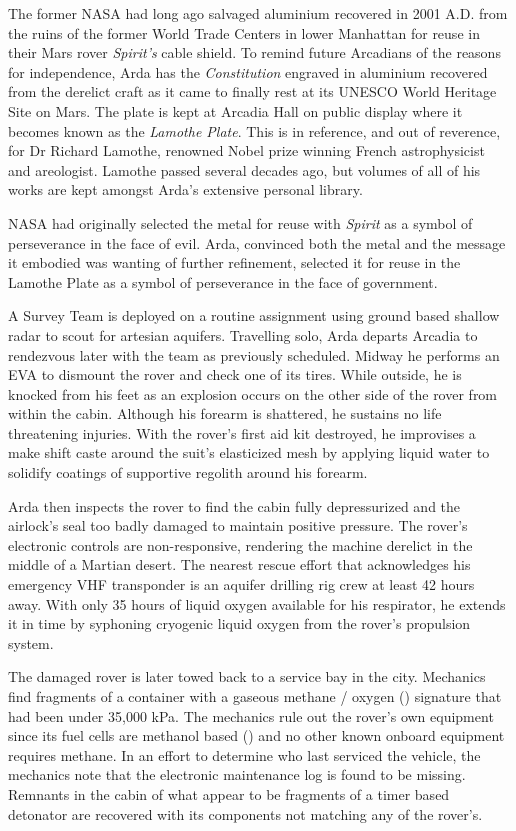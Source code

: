 The former NASA had long ago salvaged aluminium recovered in 2001 A.D. from the ruins of the former World Trade Centers in lower Manhattan for reuse in their Mars rover {\it Spirit's} cable shield. To remind future Arcadians of the reasons for independence, Arda has the {\it Constitution} engraved in aluminium recovered from the derelict craft as it came to finally rest at its UNESCO World Heritage Site on Mars. The plate is kept at Arcadia Hall on public display where it becomes known as the {\it Lamothe Plate}. This is in reference, and out of reverence, for Dr Richard Lamothe, renowned Nobel prize winning French astrophysicist and areologist. Lamothe passed several decades ago, but volumes of all of his works are kept amongst Arda's extensive personal library.

NASA had originally selected the metal for reuse with {\it Spirit} as a symbol of perseverance in the face of evil. Arda, convinced both the metal and the message it embodied was wanting of further refinement, selected it for reuse in the Lamothe Plate as a symbol of perseverance in the face of government.
\StopTimelineDate

A Survey Team is deployed on a routine assignment using ground based shallow radar to scout for artesian aquifers. Travelling solo, Arda departs Arcadia to rendezvous later with the team as previously scheduled. Midway he performs an EVA to dismount the rover and check one of its tires. While outside, he is knocked from his feet as an explosion occurs on the other side of the rover from within the cabin. Although his forearm is shattered, he sustains no life threatening injuries. With the rover's first aid kit destroyed, he improvises a make shift caste around the suit's elasticized mesh by applying liquid water to solidify coatings of supportive regolith around his forearm.

Arda then inspects the rover to find the cabin fully depressurized and the airlock's seal too badly damaged to maintain positive pressure. The rover's electronic controls are non-responsive, rendering the machine derelict in the middle of a Martian desert. The nearest rescue effort that acknowledges his emergency VHF transponder is an aquifer drilling rig crew at least 42 hours away. With only 35 hours of liquid oxygen available for his respirator, he extends it in time by syphoning cryogenic liquid oxygen from the rover's propulsion system.

The damaged rover is later towed back to a service bay in the city. Mechanics find fragments of a container with a gaseous methane / oxygen () signature that had been under 35,000 kPa. The mechanics rule out the rover's own equipment since its fuel cells are methanol based () and no other known onboard equipment requires methane. In an effort to determine who last serviced the vehicle, the mechanics note that the electronic maintenance log is found to be missing. Remnants in the cabin of what appear to be fragments of a timer based detonator are recovered with its components not matching any of the rover's.
\StopTimelineDate

